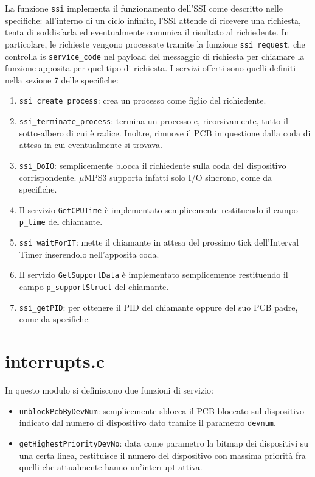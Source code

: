 \documentclass[a4paper]{article}
\begin{document}
La funzione \verb+ssi+ implementa il funzionamento dell'SSI come descritto nelle specifiche: all'interno di un ciclo infinito, l'SSI attende di ricevere una richiesta, tenta di soddisfarla ed eventualmente comunica il risultato al richiedente. In particolare, le richieste vengono processate tramite la funzione \verb+ssi_request+, che controlla is \verb+service_code+ nel payload del messaggio di richiesta per chiamare la funzione apposita per quel tipo di richiesta. I servizi offerti sono quelli definiti nella sezione 7 delle specifiche:
\begin{enumerate}
\item \verb+ssi_create_process+: crea un processo come figlio del richiedente.
\item \verb+ssi_terminate_process+: termina un processo e, ricorsivamente, tutto il sotto-albero di cui è radice. Inoltre, rimuove il PCB in questione dalla coda di attesa in cui eventualmente si trovava.
\item \verb+ssi_DoIO+: semplicemente blocca il richiedente sulla coda del dispositivo corrispondente. $\mu$MPS3 supporta infatti solo I/O sincrono, come da specifiche.
\item Il servizio \verb+GetCPUTime+ è implementato semplicemente restituendo il campo \verb+p_time+ del chiamante.
\item \verb+ssi_waitForIT+: mette il chiamante in attesa del prossimo tick dell'Interval Timer inserendolo nell'apposita coda.
\item Il servizio \verb+GetSupportData+ è implementato semplicemente restituendo il campo \verb+p_supportStruct+ del chiamante.
\item \verb+ssi_getPID+: per ottenere il PID del chiamante oppure del suo PCB padre, come da specifiche.
\end{enumerate}

\section{interrupts.c}
In questo modulo si definiscono due funzioni di servizio:
\begin{itemize}
\item \verb+unblockPcbByDevNum+: semplicemente sblocca il PCB bloccato sul dispositivo indicato dal numero di dispositivo dato tramite il parametro \verb+devnum+.
\item \verb+getHighestPriorityDevNo+: data come parametro la bitmap dei dispositivi su una certa linea, restituisce il numero del dispositivo con massima priorità fra quelli che attualmente hanno un'interrupt attiva.
\end{itemize}
\end{document}
